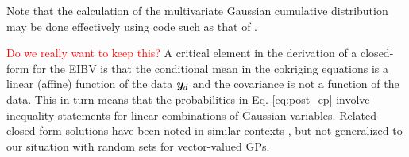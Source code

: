 Note that the calculation of the multivariate Gaussian cumulative distribution
may be done effectively using code such as that of
\cite{genz2009computation}. 

\textcolor{red}{Do we really want to keep this?}
A critical element in the derivation of a closed-form for the EIBV is
that the conditional mean in the cokriging equations is a linear
(affine) function of the data ${\boldsymbol y}_d$ and the covariance is not a
function of the data. This in turn means that the probabilities in Eq.
\eqref{eq:post_ep} involve inequality statements for linear
combinations of Gaussian variables. Related closed-form solutions have
been noted in similar contexts \citep{bhattacharjya2013value,
  chevalier2014fast,stroh}, but not generalized to our situation with
random sets for vector-valued GPs.
